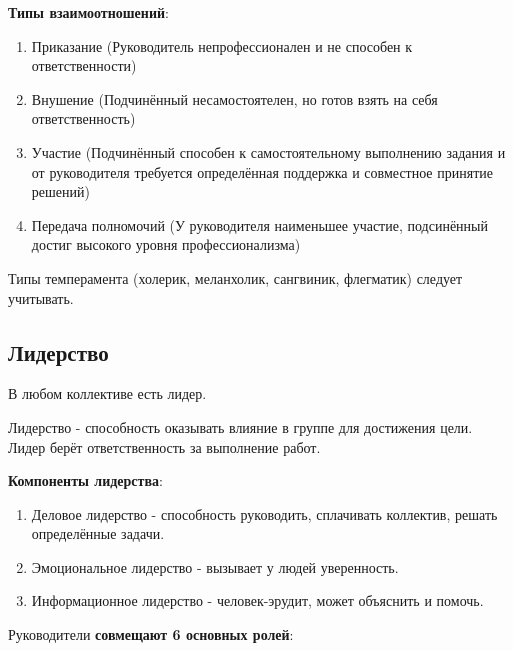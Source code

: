 \documentclass[a4paper,14pt]{extarticle}
\begin{document}
\textbf{Типы взаимоотношений}:

\begin{enumerate}
    \item Приказание (Руководитель непрофессионален и не способен к ответственности)
    \item Внушение (Подчинённый несамостоятелен, но готов взять на себя ответственность)
    \item Участие (Подчинённый способен к самостоятельному выполнению задания и от руководителя требуется определённая поддержка и совместное принятие решений)
    \item Передача полномочий (У руководителя наименьшее участие, подсинённый достиг высокого уровня профессионализма)
\end{enumerate}

Типы темперамента (холерик, меланхолик, сангвиник, флегматик) следует учитывать.

\subsection{Лидерство}

В любом коллективе есть лидер.

Лидерство - способность оказывать влияние в группе для достижения цели. Лидер берёт ответственность за выполнение работ.

\begin{multienumerate}
\end{multienumerate}

\textbf{Компоненты лидерства}:

\begin{enumerate}
    \item Деловое лидерство - способность руководить, сплачивать коллектив, решать определённые задачи.
    \item Эмоциональное лидерство - вызывает у людей уверенность.
    \item Информационное лидерство - человек-эрудит, может объяснить и помочь.
\end{enumerate}

Руководители \textbf{совмещают 6 основных ролей}:

\begin{multienumerate}
\end{multienumerate}
\end{document}

